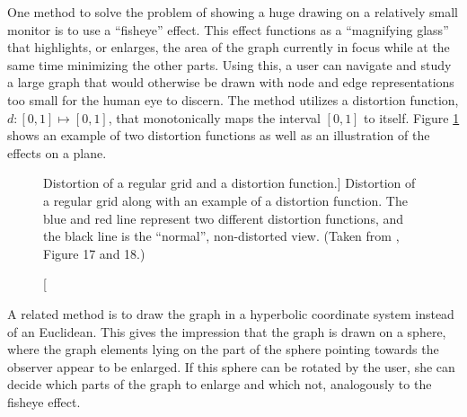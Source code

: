One method to solve the problem of showing a huge drawing on a relatively
small monitor is to use a ``fisheye'' effect. This effect functions as a
``magnifying glass'' that highlights, or enlarges, the area of the graph
currently in focus while at the same time minimizing the other parts. Using
this, a user can navigate and study a large graph that would otherwise be
drawn with node and edge representations too small for the human eye to
discern. The method utilizes a distortion function, $d:[0,1]\mapsto[0,1]$,
that monotonically maps the interval $[0,1]$ to itself. Figure
\ref{fig:images_fisheye_distortion} shows an example of two distortion functions
as well as an illustration of the effects on a plane.
\begin{figure}[htp]
	\centering
	\caption
	[Distortion of a regular grid and a distortion function.]
	{Distortion of a regular grid along with an example of a distortion function. The blue and
	red line represent two different distortion functions, and the black line is 
	the ``normal'', non-distorted view. 
	(Taken from \cite{Herman2000}, Figure 17 and 18.)}
	\label{fig:images_fisheye_distortion}
\end{figure}

A related method is to draw the graph in a hyperbolic coordinate system
instead of an Euclidean. This gives the impression that the graph is drawn on
a sphere, where the graph elements lying on the part of the sphere pointing
towards the observer appear to be enlarged. If this sphere can be rotated by
the user, she can decide which parts of the graph to enlarge and which not,
analogously to the fisheye effect.


